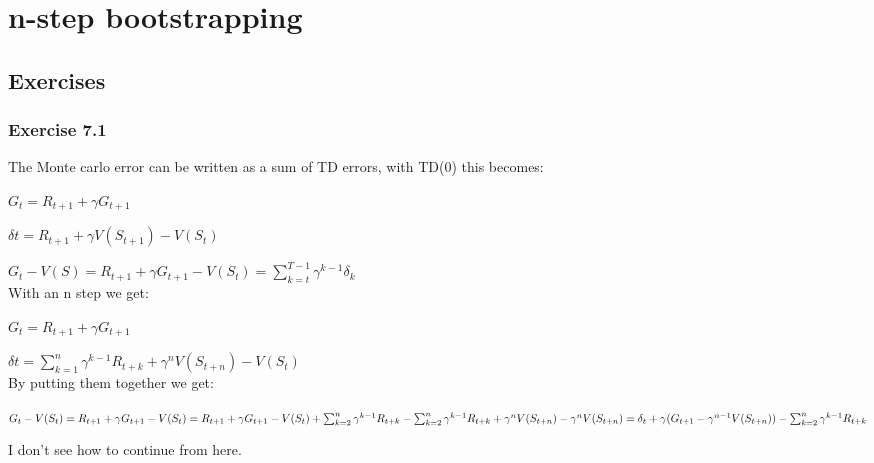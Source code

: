 \chapter{n-step bootstrapping}

\section{Exercises}

\subsection{Exercise 7.1}

The Monte carlo error can be written as a sum of TD errors, with TD(0) this becomes:

$
G_t = R_{t+1} + \gamma G_{t+1}
$

$
\delta{t} = R_{t+1} + \gamma V(S_{t+1}) - V(S_t)
$

$
G_t - V(S) = R_{t+1} + \gamma G_{t+1} - V(S_{t}) = \sum^{T-1}_{k=t} \gamma^{k-1}\delta_k
$\\

With an n step we get:

$
G_t = R_{t+1} + \gamma G_{t+1}
$

$
\delta{t} =  \sum_{k=1}^{n} \gamma^{k-1} R_{t+k} + \gamma^{n}V(S_{t+n}) - V(S_{t})
$\\

By putting them together we get:

$
G_t - V(S_t)\\
= R_{t+1} + \gamma G_{t+1} - V(S_t)\\
= R_{t+1} + \gamma G_{t+1} - V(S_t)\\
+  \sum_{k=2}^{n} \gamma^{k-1} R_{t+k} - \sum_{k=2}^{n}\gamma^{k-1} R_{t+k}\\
+ \gamma^{n}V(S_{t+n}) - \gamma^{n}V(S_{t+n})\\
= \delta_t + \gamma (G_{t+1} - \gamma^{n-1}V(S_{t+n}))  - \sum_{k=2}^{n}\gamma^{k-1} R_{t+k}
$

I don't see how to continue from here. 